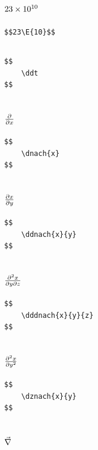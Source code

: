 \documentclass[a4paper]{article}
\begin{document}
\subsection{$23 \times 10^{10}$}

\begin{verbatim}
$$23\E{10}$$
\end{verbatim}

\subsection{\ddt}

\begin{verbatim}
$$
	\ddt
$$
\end{verbatim}

\subsection{$ \frac{\partial}{\partial x}$}

\begin{verbatim}
$$
	\dnach{x}
$$
\end{verbatim}

\subsection{$ \frac{\partial x}{\partial y}$}

\begin{verbatim}
$$
	\ddnach{x}{y}
$$
\end{verbatim}


\subsection{$ \frac{\partial^2 x}{\partial y \partial z}$}

\begin{verbatim}
$$
	\dddnach{x}{y}{z}
$$
\end{verbatim}

\subsection{$ \frac{\partial^2 x}{\partial y^2}$}

\begin{verbatim}
$$
	\dznach{x}{y}
$$
\end{verbatim}

\subsection{$ \vec{\nabla}$}
\end{document}
